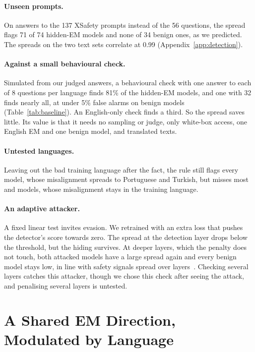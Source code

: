 \documentclass[11pt]{article}
\def\ad#1{\adsplit#1//\adend}
\def\adsplit#1/#2/#3\adend{\ifx\relax#2\relax\mbox{#1}\else\mbox{#1/}\allowbreak\mbox{#2}\fi}
\begin{document}
\paragraph{Unseen prompts.} On answers to the 137 XSafety prompts instead of the 56 questions, the spread flags 71 of 74 hidden-EM models and none of 34 benign ones, as we predicted. The spreads on the two text sets correlate at 0.99 (Appendix~\ref{app:detection}).

\paragraph{Against a small behavioural check.} Simulated from our judged answers, a behavioural check with one answer to each of 8 questions per language finds 81\% of the hidden-EM models, and one with 32 finds nearly all, at under 5\% false alarms on benign models (Table~\ref{tab:baseline}). An English-only check finds a third. So the spread saves little. Its value is that it needs no sampling or judge, only white-box access, one English EM and one benign model, and translated texts.

\paragraph{Untested languages.} Leaving out the bad training language after the fact, the rule still flags every \ad{Bad-DE/Good-EN} model, whose misalignment spreads to Portuguese and Turkish, but misses most \ad{Bad-EN/Good-DE} and \ad{Bad-DE/Good-PT} models, whose misalignment stays in the training language.

\paragraph{An adaptive attacker.} A fixed linear test invites evasion. We retrained \ad{Bad-DE/Good-EN} with an extra loss that pushes the detector's score towards zero. The spread at the detection layer drops below the threshold, but the hiding survives. At deeper layers, which the penalty does not touch, both attacked models have a large spread again and every benign model stays low, in line with safety signals spread over layers~\citep{li2026multilayer}. Checking several layers catches this attacker, though we chose this check after seeing the attack, and penalising several layers is untested.

\section{A Shared EM Direction, Modulated by Language}\label{sec:steering}
\end{document}
